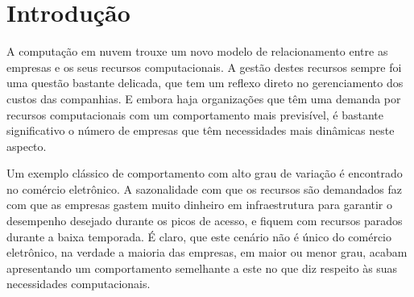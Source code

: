 \documentclass[twoside,english,brazilian]{UNISINOSmonografia}
\begin{document}
%

\tableofcontents

\chapter{Introdução}


A computação em nuvem trouxe um novo modelo de relacionamento entre as empresas e os seus recursos computacionais. A gestão destes recursos sempre foi uma questão bastante delicada, que tem um reflexo direto no gerenciamento dos custos das companhias. E embora haja organizações que têm uma demanda por recursos computacionais com um comportamento mais previsível, é bastante significativo o número de empresas que têm necessidades mais dinâmicas neste aspecto.

Um exemplo clássico de comportamento com alto grau de variação é encontrado no comércio eletrônico. A sazonalidade com que os recursos são demandados faz com que as empresas gastem muito dinheiro em infraestrutura para garantir o desempenho desejado durante os picos de acesso, e fiquem com recursos parados durante a baixa temporada. É claro, que este cenário não é único do comércio eletrônico, na verdade a maioria das empresas, em maior ou menor grau, acabam apresentando um comportamento semelhante a este no que diz respeito às suas necessidades computacionais.
\end{document}
